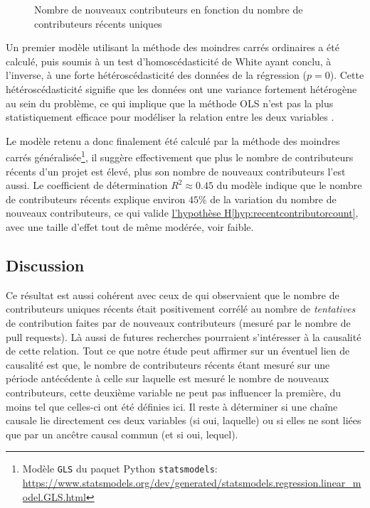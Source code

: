 \begin{figure}
    

    

    \caption{Nombre de nouveaux contributeurs en fonction du nombre de contributeurs récents uniques}
    \label{fig:contributorCount}
\end{figure}

Un premier modèle utilisant la méthode des moindres carrés ordinaires a été calculé, puis soumis à un test
d'homoscédasticité de White ayant conclu, à l'inverse, à une forte hétéroscédasticité des données de la
régression ($p = 0$). Cette hétéroscédasticité signifie que les données ont une variance fortement hétérogène
au sein du problème, ce qui implique que la méthode OLS n'est pas la plus statistiquement efficace pour
modéliser la relation entre les deux variables \parencite{GLS-2021}.

Le modèle retenu a donc finalement été calculé par la méthode des moindres carrés généralisée\footnote{Modèle
\texttt{GLS} du paquet Python \texttt{statsmodels}:
\url{https://www.statsmodels.org/dev/generated/statsmodels.regression.linear_model.GLS.html}}, il suggère
effectivement que plus le nombre de contributeurs récents d'un projet est élevé, plus son nombre de nouveaux
contributeurs l'est aussi. Le coefficient de détermination $R^2 \approx 0.45$ du modèle indique que le nombre
de contributeurs récents explique environ $45\%$ de la variation du nombre de nouveaux contributeurs, ce qui
valide \hyperref[hyp:recentcontributorcount]{l'hypothèse H\ref*{hyp:recentcontributorcount}}, avec une taille
d'effet tout de même modérée, voir faible.

\subsection{Discussion}

Ce résultat est aussi cohérent avec ceux de \textcite[p.~12-13,16]{signals-2019} qui observaient que le nombre
de contributeurs uniques récents était positivement corrélé au nombre de \emph{tentatives} de contribution
faites par de nouveaux contributeurs (mesuré par le nombre de \glspl{pull request}). Là aussi de futures
recherches pourraient s'intéresser à la causalité de cette relation. Tout ce que notre étude peut affirmer sur
un éventuel lien de causalité est que, le nombre de contributeurs récents étant mesuré sur une période
antécédente à celle sur laquelle est mesuré le nombre de nouveaux contributeurs, cette deuxième variable ne
peut pas influencer la première, du moins tel que celles-ci ont été définies ici. Il reste à déterminer si une
chaîne causale lie directement ces deux variables (si oui, laquelle) ou si elles ne sont liées que par un
ancêtre causal commun (et si oui, lequel).

